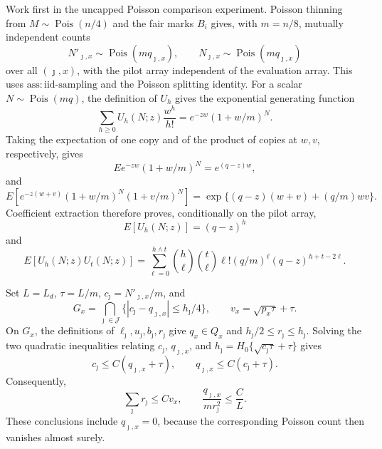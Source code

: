 Work first in the uncapped Poisson comparison experiment.  Poisson thinning from \(M\sim\operatorname{Pois}(n/4)\) and the fair marks \(B_i\) gives, with \(m=n/8\), mutually independent counts
\[
 N'_{\jmath,x}\sim\operatorname{Pois}(mq_{\jmath,x}),\qquad
 N_{\jmath,x}\sim\operatorname{Pois}(mq_{\jmath,x})
\]
over all \((\jmath,x)\), with the pilot array independent of the evaluation array.  This uses \(\mathrm{ass:iid\mbox{-}sampling}\) and the Poisson splitting identity.  For a scalar \(N\sim\operatorname{Pois}(mq)\), the definition of \(U_h\) gives the exponential generating function
\[
 \sum_{h\geq0}U_h(N;z)\frac{w^h}{h!}=e^{-zw}(1+w/m)^N.
\]
Taking the expectation of one copy and of the product of copies at \(w,v\), respectively, gives
\[
 E e^{-zw}(1+w/m)^N=e^{(q-z)w},
\]
and
\[
 E\!\left[e^{-z(w+v)}(1+w/m)^N(1+v/m)^N\right]
 =\exp\{(q-z)(w+v)+(q/m)wv\}.
\]
Coefficient extraction therefore proves, conditionally on the pilot array,
\[
 E[U_h(N;z)]=(q-z)^h
\]
and
\[
 E[U_h(N;z)U_t(N;z)]
 =\sum_{\ell=0}^{h\wedge t}\binom h\ell\binom t\ell\ell!(q/m)^\ell(q-z)^{h+t-2\ell}.
\]

Set \(L=L_d\), \(\tau=L/m\), \(c_\jmath=N'_{\jmath,x}/m\), and
\[
 G_x=\bigcap_{\jmath\in\mathcal J}
 \bigl\{|c_\jmath-q_{\jmath,x}|\leq h_\jmath/4\bigr\},
 \qquad v_x=\sqrt{p_x\tau}+\tau.
\]
On \(G_x\), the definitions of \(\ell_\jmath,u_\jmath,b_\jmath,r_\jmath\) give \(q_x\in Q_x\) and \(h_\jmath/2\leq r_\jmath\leq h_\jmath\).  Solving the two quadratic inequalities relating \(c_\jmath\), \(q_{\jmath,x}\), and \(h_\jmath=H_0\{\sqrt{c_\jmath\tau}+\tau\}\) gives
\[
 c_\jmath\leq C(q_{\jmath,x}+\tau),\qquad
 q_{\jmath,x}\leq C(c_\jmath+\tau).
\]
Consequently,
\[
 \sum_\jmath r_\jmath\leq Cv_x,
 \qquad
 \frac{q_{\jmath,x}}{mr_\jmath^2}\leq\frac C L.                 \tag{4}
\]
These conclusions include \(q_{\jmath,x}=0\), because the corresponding Poisson count then vanishes almost surely.

